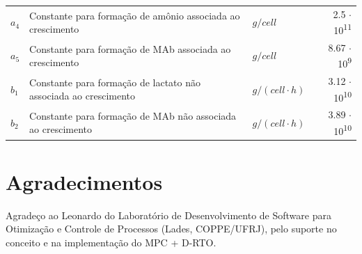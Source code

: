 \documentclass[fleqn,10pt]{SelfArx} %
\begin{document}
\begin{table}[hb]
\begin{tabular}{lllr}
		$a_4$ & Constante para formação de amônio  associada ao crescimento & $ g/cell $ & 2.5 $\cdot$ 10\textsuperscript{11}\\
		$a_5$ & Constante para formação de MAb associada ao crescimento  & $ g/cell $  & 8.67 $\cdot$ 10\textsuperscript{9}\\
		$b_1$ & Constante para formação de lactato não associada ao crescimento & $ g/(cell\cdot h) $ & 3.12 $\cdot$ 10\textsuperscript{10}\\
		$b_2$ & Constante para formação de MAb não associada ao crescimento & $ g/(cell\cdot h) $ & 3.89 $\cdot$ 10\textsuperscript{10}\\
	\end{tabular}
	\label{tab:parameters}
\end{table}


\section*{Agradecimentos} %
Agradeço ao Leonardo do Laboratório de Desenvolvimento de Software para Otimização e Controle de Processos (Lades, COPPE/UFRJ), pelo suporte no conceito e na implementação do MPC + D-RTO.



\end{document}

